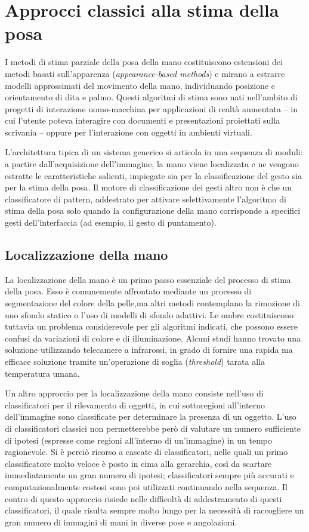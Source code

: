 \section{Approcci classici alla stima della posa}

I metodi di stima parziale della posa della mano costituiscono estensioni dei metodi basati sull'apparenza (\emph{appearance-based methods}) e mirano a estrarre modelli approssimati del movimento della mano, individuando posizione e orientamento di dita e palmo.
Questi algoritmi di stima sono nati nell'ambito di progetti di interazione uomo-macchina per applicazioni di realtà aumentata -- in cui l'utente poteva interagire con documenti e presentazioni proiettati sulla scrivania -- oppure per l'interazione con oggetti in ambienti virtuali.

L'architettura tipica di un sistema generico si articola in una sequenza di moduli:
a partire dall'acquisizione dell'immagine, la mano viene localizzata e ne vengono estratte le caratteristiche salienti, impiegate sia per la classificazione del gesto sia per la stima della posa.
Il motore di classificazione dei gesti altro non è che un classificatore di pattern,
addestrato per attivare selettivamente l'algoritmo di stima della posa solo quando la configurazione della mano corrisponde a specifici gesti dell'interfaccia (ad esempio, il gesto di puntamento).


\subsection{Localizzazione della mano}

La localizzazione della mano è un primo passo essenziale del processo di stima della posa.
Esso è comunemente affrontato mediante un processo di segmentazione del colore della pelle,ma altri metodi contemplano la rimozione di uno sfondo statico o l'uso di modelli di sfondo adattivi.
Le ombre costituiscono tuttavia un problema considerevole per gli algoritmi indicati, che possono essere confusi da variazioni di colore e di illuminazione.
Alcuni studi hanno trovato una soluzione utilizzando telecamere a infrarossi, in grado di fornire una rapida ma efficace soluzione tramite un'operazione di soglia (\emph{threshold}) tarata alla temperatura umana.

Un altro approccio per la localizzazione della mano consiste nell'uso di classificatori per il rilevamento di oggetti, in cui sottoregioni all'interno dell'immagine sono classificate per determinare la presenza di un oggetto.
L'uso di classificatori classici non permetterebbe però di valutare un numero sufficiente di ipotesi (espresse come regioni all'interno di un'immagine) in un tempo ragionevole.
Si è perciò ricorso a cascate di classificatori, nelle quali un primo classificatore molto veloce è posto in cima alla gerarchia, così da scartare immediatamente un gran numero di ipotesi; 
classificatori sempre più accurati e computazionalmente costosi sono poi utilizzati continuando nella sequenza.
Il contro di questo approccio risiede nelle difficoltà di addestramento di questi classificatori, il quale risulta sempre molto lungo per la necessità di raccogliere un gran numero di immagini di mani in diverse pose e angolazioni.



